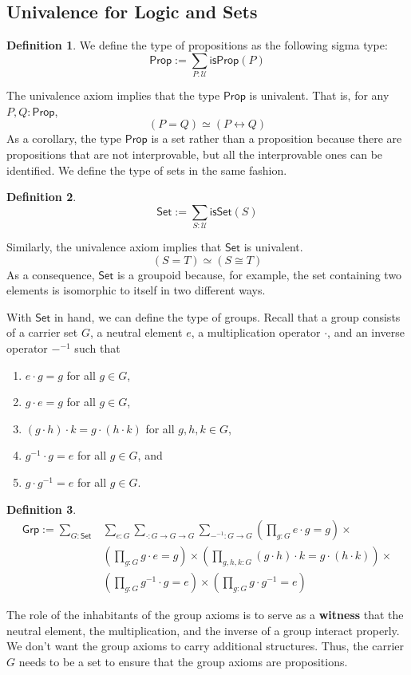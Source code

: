 \documentclass{amsart}
\theoremstyle{definition}
\newtheorem{defn}{Definition}[section]
\newcommand{\Prop}{\ensuremath{\mathsf{Prop}}}
\newcommand{\isProp}{\ensuremath{\mathsf{isProp}}}
\newcommand{\Set}{\ensuremath{\mathsf{Set}}}
\newcommand{\isSet}{\ensuremath{\mathsf{isSet}}}
\newcommand{\Grp}{\ensuremath{\mathsf{Grp}}}
\newcommand{\U}{\ensuremath{\mathcal{U}}}
\renewcommand{\emph}{\textbf}
\begin{document}
\subsection{Univalence for Logic and Sets}\label{sec:univalence-for-logic-and-sets}
\begin{defn}
    We define the type of propositions as the following sigma type:
    \[\Prop := \sum_{P : \U} \isProp(P)\]
\end{defn}
The univalence axiom implies that the type $\Prop$ is univalent.
That is, for any $P, Q : \Prop$,
\[
    (P = Q) \simeq (P \leftrightarrow Q)
\]
As a corollary, the type $\Prop$ is a set rather than a proposition because there are propositions that are not interprovable, but all the interprovable ones can be identified.
We define the type of sets in the same fashion.
\begin{defn}
\[
    \Set := \sum_{S : \U} \isSet(S)
\]
\end{defn}
Similarly, the univalence axiom implies that $\Set$ is univalent.
\[
    (S = T) \simeq (S \cong T)
\]
As a consequence, $\Set$ is a groupoid because, for example, the set containing two elements is isomorphic to itself in two different ways.

With $\Set$ in hand, we can define the type of groups.
Recall that a group consists of a carrier set $G$, a neutral element $e$, a multiplication operator $\cdot$, and an inverse operator $-^{-1}$ such that
\begin{enumerate}
    \item $e \cdot g = g$ for all $g \in G$,
    \item $g \cdot e = g$ for all $g \in G$,
    \item $(g \cdot h) \cdot k = g \cdot (h \cdot k)$ for all $g, h, k \in G$,
    \item $g^{-1} \cdot g = e$ for all $g \in G$, and
    \item $g \cdot g^{-1} = e$ for all $g \in G$.
\end{enumerate}
\begin{defn}
    \begin{align*}
        \Grp := \sum_{G : \Set}&\sum_{e : G}\sum_{\cdot : G \to G \to G}\sum_{-^{-1} : G \to G}\left(\prod_{g : G} e \cdot g = g\right) \times\\
        &\left(\prod_{g : G} g \cdot e = g\right) \times \left(\prod_{g,h,k : G}(g \cdot h) \cdot k = g \cdot (h \cdot k)\right) \times\\
        &\left(\prod_{g : G}g^{-1} \cdot g = e\right) \times \left(\prod_{g : G}g \cdot g^{-1} = e\right)
    \end{align*}
\end{defn}
The role of the inhabitants of the group axioms is to serve as a \emph{witness} that the neutral element, the multiplication, and the inverse of a group interact properly.
We don't want the group axioms to carry additional structures.
Thus, the carrier $G$ needs to be a set to ensure that the group axioms are propositions.
\end{document}
